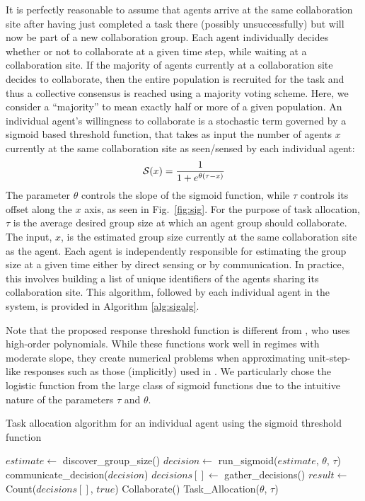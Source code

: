 \documentclass[Main.tex]{subfiles}
\begin{document}
It is perfectly reasonable to assume that agents arrive at the same collaboration site after having just completed a task there (possibly unsuccessfully) but will now be part of a new collaboration group. Each agent individually decides whether or not to collaborate at a given time step, while waiting at a collaboration site. If the majority of agents currently at a collaboration site decides to collaborate, then the entire population is recruited for the task and thus a collective consensus is reached using a majority voting scheme. Here, we consider a ``majority'' to mean exactly half or more of a given population. An individual agent's willingness to collaborate is a stochastic term governed by a sigmoid based threshold function, that takes as input the number of agents $x$ currently at the same collaboration site as seen/sensed by each individual agent:
\begin{equation}
	\mathcal{S}(x) = \frac{1}{1+e^{\theta(\tau - x)}}\label{eq:sig}
\end{equation}
The parameter $\theta$ controls the slope of the sigmoid function, while $\tau$ controls its offset along the $x$ axis, as seen in Fig.~\ref{fig:sig}. For the purpose of task allocation, $\tau$ is the average desired group size at which an agent group should collaborate. The input, $x$, is the estimated group size currently at the same collaboration site as the agent. Each agent is independently responsible for estimating the group size at a given time either by direct sensing or by communication. In practice,  this involves building a list of unique identifiers of the agents sharing its collaboration site. This algorithm, followed by each individual agent in the system, is provided in Algorithm \ref{alg:sigalg}.

Note that the proposed response threshold function is different from \cite{Bonabeau1999}, who uses high-order polynomials. While these functions work well in regimes with moderate slope, they create numerical problems when approximating unit-step-like responses such as those (implicitly) used in \cite{Lerman2001}. We particularly chose the logistic function from the large class of sigmoid functions due to the intuitive nature of the parameters $\tau$ and $\theta$. 

\begin{algorithm}
\caption{Task allocation algorithm for an individual agent using the sigmoid threshold function}
\label{alg:sigalg}
\begin{algorithmic}
	\State $estimate \gets$ discover\_group\_size()
	\State $decision \gets$ run\_sigmoid($estimate$, $\theta$, $\tau$)
	\State communicate\_decision($decision$)
	\State $decisions[] \gets$ gather\_decisions()
	\State $result \gets$ Count($decisions[]$, $true$) 
		\State Collaborate()
		\State \Return
	\Else
		\State Task\_Allocation($\theta$, $\tau$)
	\EndIf
	\EndFunction
\end{algorithmic} 
\end{algorithm}
\end{document}
